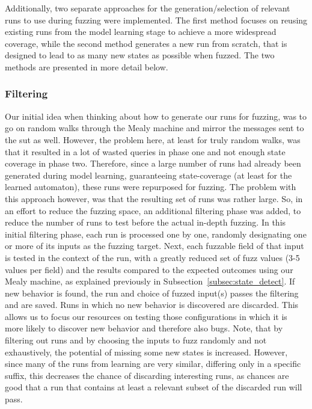 Additionally, two separate approaches for the generation/selection of relevant runs to use during fuzzing were implemented. The first method focuses on reusing existing runs from the model learning stage to achieve a more widespread coverage, while the second method generates a new run from scratch, that is designed to lead to as many new states as possible when fuzzed. The two methods are presented in more detail below.

\subsubsection{Filtering} \label{subsubsec:fuzz_filtering}
Our initial idea when thinking about how to generate our runs for fuzzing, was to go on random walks through the Mealy machine and mirror the messages sent to the \ac{sut} as well. However, the problem here, at least for truly random walks, was that it resulted in a lot of wasted queries in phase one and not enough state coverage in phase two. Therefore, since a large number of runs had already been generated during model learning, guaranteeing state-coverage (at least for the learned automaton), these runs were repurposed for fuzzing. The problem with this approach however, was that the resulting set of runs was rather large. So, in an effort to reduce the fuzzing space, an additional filtering phase was added, to reduce the number of runs to test before the actual in-depth fuzzing. In this initial filtering phase, each run is processed one by one, randomly designating one or more of its inputs as the fuzzing target. Next, each fuzzable field of that input is tested in the context of the run, with a greatly reduced set of fuzz values (3-5 values per field) and the results compared to the expected outcomes using our Mealy machine, as explained previously in Subsection~\ref{subsec:state_detect}. If new behavior is found, the run and choice of fuzzed input(s) passes the filtering and are saved. Runs in which no new behavior is discovered are discarded. This allows us to focus our resources on testing those configurations in which it is more likely to discover new behavior and therefore also bugs.
Note, that by filtering out runs and by choosing the inputs to fuzz randomly and not exhaustively, the potential of missing some new states is increased. However, since many of the runs from learning are very similar, differing only in a specific suffix, this decreases the chance of discarding interesting runs, as chances are good that a run that contains at least a relevant subset of the discarded run will pass.

